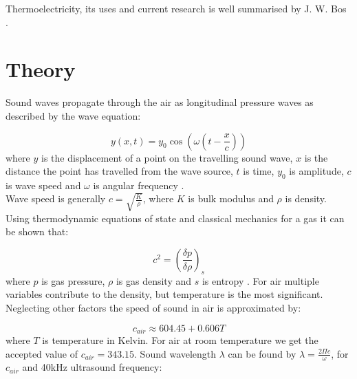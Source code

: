 \documentclass[a4paper,10pt,journal]{IEEEtran}
\begin{document}
Thermoelectricity, its uses and current research is well summarised by
J. W. Bos \cite{rsc-eic}.


\section{Theory}
Sound waves propagate through the air as longitudinal pressure waves as described by the wave equation:

\begin{equation}
\label{eq:sound-wave}
	y(x,t) = y_0 \cos(\omega(t-\frac{x}{c}))
\end{equation}
where $y$ is the displacement of a point on the travelling sound wave, $x$ is the distance the point has travelled from the wave source, $t$ is time, $y_0$ is amplitude, $c$ is wave speed and $\omega$ is angular frequency \cite{young-book}.\\
Wave speed is generally $c = \sqrt{\frac{K}{\rho}}$, where $K$ is bulk modulus and $\rho$ is density. Using thermodynamic equations of state and classical mechanics for a gas it can be shown that:

\begin{equation}
\label{eq:speed}
	c^2 = (\frac{\delta p}{\delta \rho})_s
\end{equation}
where $p$ is gas pressure, $\rho$ is gas density and $s$ is entropy \cite{young-book}. For air multiple variables contribute to the density, but temperature is the most significant. Neglecting other factors the speed of sound in air is approximated by:

\begin{equation}
\label{eq:speed-in-air}
	 c_{air} \approx 604.45 + 0.606T
\end{equation}
where $T$ is temperature in Kelvin. For air at room temperature we get the accepted value of $c_{air} = 343.15$.
Sound wavelength $\lambda$ can be found by $\lambda = \frac{2\Pi c}{\omega}$, for $c_{air}$ and 40kHz ultrasound frequency:
\end{document}

